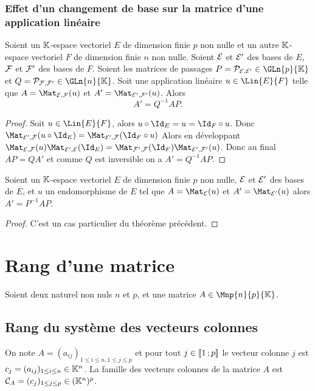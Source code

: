 \subsubsection{Effet d'un changement de base sur la matrice d'une application linéaire}

\begin{theo}
  Soient un $\mathbb{K}$-espace vectoriel $E$ de dimension finie $p$ non nulle et un autre $\mathbb{K}$-espace vectoriel $F$ de dimension finie $n$ non nulle. Soient $\mathcal{E}$ et $\mathcal{E}'$ des bases de $E$, $\mathcal{F}$ et $\mathcal{F}'$ des bases de $F$. Soient les matrices de passages $P=\P_{\E,\E'} \in \GLn{p}{\K}$ et $Q=\P_{\F,\F'} \in \GLn{n}{\K}$. Soit une application linéaire $u \in \Lin{E}{F}$ telle que $A=\Mat_{\E,\F}(u)$ et $A'=\Mat_{\E',\F'}(u)$. Alors
  \begin{equation}
    A'=Q^{-1}AP.
  \end{equation}
\end{theo}
\begin{proof}
  Soit  $u \in \Lin{E}{F}$, alors $u \circ \Id_E = u = \Id_F \circ u$. Donc $\Mat_{\E',\F}(u \circ \Id_E) = \Mat_{\E',\F}(\Id_F \circ u)$ Alors en développant $\Mat_{\E,\F}(u) \Mat_{\E',\E}(\Id_E) =\Mat_{\F',\F}(\Id_F) \Mat_{\E',\F'}(u) $. Donc au final $AP=QA'$ et comme $Q$ est inversible on a $A'=Q^{-1}AP$.
\end{proof}

\begin{theo}
   Soient un $\mathbb{K}$-espace vectoriel $E$ de dimension finie $p$ non nulle, $\mathcal{E}$ et $\mathcal{E}'$ des bases de $E$, et $u$ un endomorphisme de $E$ tel que $A=\Mat_{\E}(u)$ et $A'=\Mat_{\E'}(u)$ alors $A'=P^{-1}AP$.
\end{theo}
\begin{proof}
  C'est un cas particulier du théorème précédent.
\end{proof}

\section{Rang d'une matrice}

Soient deux naturel non nuls $n$ et $p$, et une matrice $A \in \Mnp{n}{p}{\K}$.

\subsection{Rang du système des vecteurs colonnes}

On note $A=(a_{ij})_{1\leq i\leq n, 1\leq j\leq p}$ et pour tout $j \in \mathopen{\llbracket}1\mathclose{}\mathpunct{};p\mathclose{\rrbracket}$ le vecteur colonne $j$ est $c_j=(a_{ij})_{1 \leq i \leq n} \in \mathbb{K}^n$. La famille des vecteurs colonnes de la matrice $A$ est $\mathcal{C}_A=(c_j)_{1 \leq j \leq p} \in (\mathbb{K}^n)^p$.

